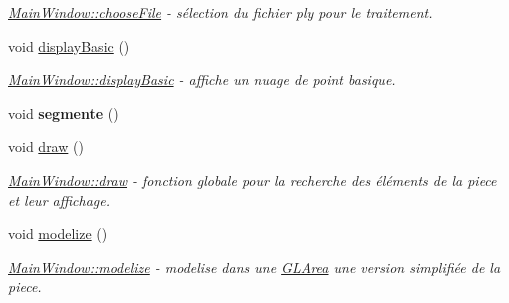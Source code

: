\begin{DoxyCompactItemize}
\begin{DoxyCompactList}\small\item\em \hyperlink{classMainWindow_ad9414920d90d79a159c013deb5adbfbe}{Main\+Window\+::choose\+File} -\/ sélection du fichier ply pour le traitement. \end{DoxyCompactList}\item 
\mbox{\label{classMainWindow_a91efdbf7f70a09ad4d790c85b7bec6ba}} 
void \hyperlink{classMainWindow_a91efdbf7f70a09ad4d790c85b7bec6ba}{display\+Basic} ()
\begin{DoxyCompactList}\small\item\em \hyperlink{classMainWindow_a91efdbf7f70a09ad4d790c85b7bec6ba}{Main\+Window\+::display\+Basic} -\/ affiche un nuage de point basique. \end{DoxyCompactList}\item 
\mbox{\label{classMainWindow_a42d82e5bb2368b2aabd251c38482a811}} 
void {\bfseries segmente} ()
\item 
\mbox{\label{classMainWindow_a16c24245d00afb35b6a3df17f5954adf}} 
void \hyperlink{classMainWindow_a16c24245d00afb35b6a3df17f5954adf}{draw} ()
\begin{DoxyCompactList}\small\item\em \hyperlink{classMainWindow_a16c24245d00afb35b6a3df17f5954adf}{Main\+Window\+::draw} -\/ fonction globale pour la recherche des éléments de la piece et leur affichage. \end{DoxyCompactList}\item 
\mbox{\label{classMainWindow_a4bba121d07a37b44cbb89f10e25e4f42}} 
void \hyperlink{classMainWindow_a4bba121d07a37b44cbb89f10e25e4f42}{modelize} ()
\begin{DoxyCompactList}\small\item\em \hyperlink{classMainWindow_a4bba121d07a37b44cbb89f10e25e4f42}{Main\+Window\+::modelize} -\/ modelise dans une \hyperlink{classGLArea}{G\+L\+Area} une version simplifiée de la piece. \end{DoxyCompactList}\end{DoxyCompactItemize}
